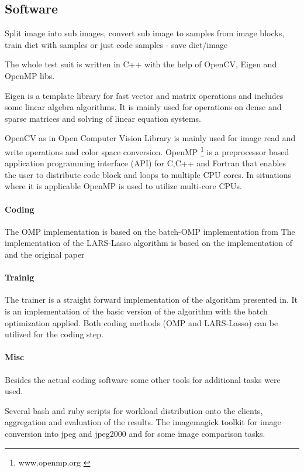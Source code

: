 \subsection*{Software}

Split image into sub images, convert sub image to samples from image blocks, 
train dict with samples or just code samples - save dict/image

The whole test suit is written in C++ with the help  of OpenCV, Eigen and OpenMP libs.

Eigen \cite{Eigen} is a template library for fast vector and matrix operations 
and includes some linear algebra algorithms. It is mainly used for operations on
dense and sparse matrices and solving of linear equation systems.

OpenCV \cite{OpenCV} as in Open Computer Vision Library is mainly used for
image read and write operations and color space conversion. OpenMP
\footnote{www.openmp.org \cite{OpenMP}} is a preprocessor based application
programming interface (API) for C,C++ and Fortran that enables the user to
distribute code block and loops to multiple CPU cores. In situations where it is
applicable OpenMP is used to utilize multi-core CPUs. 

\paragraph{Coding}
The OMP implementation is based on the batch-OMP implementation
from\cite{Rubinstein} The implementation of the LARS-Lasso algorithm is based on
the implementation of\cite{Strand2005} and the original paper\cite{Efron2004}

\paragraph{Trainig}
The \trainDL trainer is a straight forward implementation of the
algorithm presented in\cite{Mairal2010}. It is an implementation of the basic
version of the algorithm with the batch optimization applied. Both coding
methods (OMP and LARS-Lasso) can be utilized for the coding step.

\paragraph{Misc}
 Besides the actual coding software some other tools for
additional tasks were used.

Several bash and ruby scripts for workload distribution onto the
clients, aggregation and evaluation of the results. The imagemagick toolkit for
image conversion into jpeg and jpeg2000 and for some image comparison tasks.









